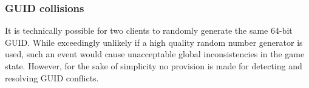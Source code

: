 \documentclass{article}
\begin{document}
\subsubsection{GUID collisions}
It is technically possible for two clients to randomly generate the same
64-bit GUID.  While exceedingly unlikely if a high quality random number
generator is used, such an event would cause unacceptable global
inconsistencies in the game state.  However, for the sake of simplicity
no provision is made for detecting and resolving GUID conflicts.
\end{document}

